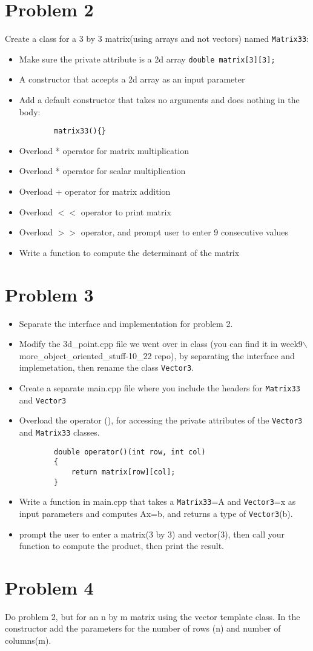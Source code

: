 \documentclass[a4paper]{article}
\begin{document}
\section*{Problem 2}
Create a class for a 3 by 3 matrix(using arrays and not vectors) named \texttt{Matrix33}:
\begin{itemize}
    \item Make sure the private attribute is a 2d array \texttt{double matrix[3][3];}
    \item A constructor that accepts a 2d array as an input parameter
    \item Add a default constructor that takes no arguments and does nothing in the body: \begin{verbatim}
        matrix33(){}
    \end{verbatim} 
    \item Overload * operator for matrix multiplication
    \item Overload * operator for scalar multiplication
    \item Overload + operator for matrix addition
    \item Overload $<<$ operator to print matrix
    \item Overload $>>$ operator, and prompt user to enter 9 consecutive values
    \item Write a function to compute the determinant of the matrix 
\end{itemize}
\newpage

\section*{Problem 3}
\begin{itemize}
    \item Separate the interface and implementation for problem 2.
    \item Modify the 3d\_point.cpp file we went over in class
    (you can find it in week9$\backslash$more\_object\_oriented\_stuff-10\_22 repo), 
    by separating the interface and implemetation, then rename the class \texttt{Vector3}.
    \item Create a separate main.cpp file where you include the headers for \texttt{Matrix33} and \texttt{Vector3}
    \item Overload the operator (), for accessing the private attributes of the \texttt{Vector3} and \texttt{Matrix33} classes.
    \begin{verbatim}
        double operator()(int row, int col)
        {
            return matrix[row][col];
        }
    \end{verbatim} 
    \item Write a function in main.cpp that takes a  \texttt{Matrix33}=A and \texttt{Vector3}=x as input parameters
          and computes Ax=b, and returns a type of \texttt{Vector3}(b). 
    \item prompt the user to enter a matrix(3 by 3) and vector(3), then call your function to compute the product, then print the result.
\end{itemize}
\newpage
 

\section*{Problem 4}
Do problem 2, but for an n by m matrix using the vector template class. 
In the constructor add the parameters for the number of rows (n) and number of columns(m).
\end{document}
